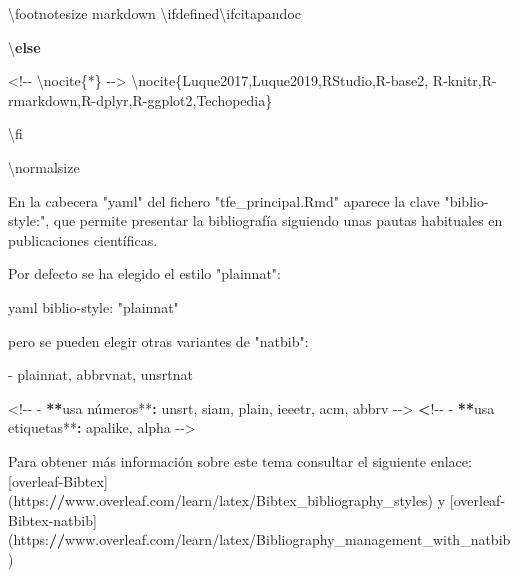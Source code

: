 \documentclass[11pt,a4paper,oneside,]{article}
\newenvironment{Shaded}{\begin{snugshade}}{\end{snugshade}}
\newcommand{\AttributeTok}[1]{\textcolor[rgb]{0.77,0.63,0.00}{#1}}
\newcommand{\ControlFlowTok}[1]{\textcolor[rgb]{0.13,0.29,0.53}{\textbf{#1}}}
\newcommand{\ErrorTok}[1]{\textcolor[rgb]{0.64,0.00,0.00}{\textbf{#1}}}
\newcommand{\NormalTok}[1]{#1}
\newcommand{\OtherTok}[1]{\textcolor[rgb]{0.56,0.35,0.01}{#1}}
\newcommand{\SpecialCharTok}[1]{\textcolor[rgb]{0.00,0.00,0.00}{#1}}
\newcommand{\StringTok}[1]{\textcolor[rgb]{0.31,0.60,0.02}{#1}}
\numberwithin{dummy}{section}
\theoremstyle{ocrenumbox}
\theoremstyle{blacknumex}
\theoremstyle{blacknumbox}
\theoremstyle{ocrenum}
\theoremstyle{ocrenum}
\begin{document}
\begin{Shaded}
\begin{Highlighting}[numbers=left,,firstnumber=1101,]
\NormalTok{\textbackslash{}footnotesize}
\StringTok{\textasciigrave{}\textasciigrave{}\textasciigrave{}\textasciigrave{}}\NormalTok{markdown}
\NormalTok{\textbackslash{}ifdefined\textbackslash{}ifcitapandoc}

\NormalTok{\textbackslash{}}\ControlFlowTok{else}

\SpecialCharTok{\textless{}!{-}{-}}\NormalTok{ \textbackslash{}nocite\{}\SpecialCharTok{*}\NormalTok{\} }\SpecialCharTok{{-}}\OtherTok{{-}\textgreater{}}
\NormalTok{\textbackslash{}nocite\{Luque2017,Luque2019,RStudio,R}\SpecialCharTok{{-}}\NormalTok{base2,}
\NormalTok{R}\SpecialCharTok{{-}}\NormalTok{knitr,R}\SpecialCharTok{{-}}\NormalTok{rmarkdown,R}\SpecialCharTok{{-}}\NormalTok{dplyr,R}\SpecialCharTok{{-}}\NormalTok{ggplot2,Techopedia\}}

\NormalTok{\textbackslash{}fi }

\StringTok{\textasciigrave{}\textasciigrave{}\textasciigrave{}\textasciigrave{}}
\NormalTok{\textbackslash{}normalsize}

 


\NormalTok{En la cabecera }\StringTok{"yaml"}\NormalTok{ del fichero }\StringTok{"tfe\_principal.Rmd"}\NormalTok{ aparece la clave }\StringTok{"biblio{-}style:"}\NormalTok{, que permite presentar la bibliografía siguiendo unas pautas habituales en publicaciones científicas. }

\NormalTok{Por defecto se ha elegido el estilo }\StringTok{"plainnat"}\SpecialCharTok{:}

\StringTok{\textasciigrave{}\textasciigrave{}\textasciigrave{}}\AttributeTok{yaml}
\AttributeTok{biblio{-}style: "plainnat" }
\StringTok{\textasciigrave{}\textasciigrave{}\textasciigrave{}}

\NormalTok{pero se pueden elegir otras variantes de }\StringTok{"natbib"}\SpecialCharTok{:}

\SpecialCharTok{{-}}\NormalTok{ plainnat, abbrvnat, unsrtnat}

\SpecialCharTok{\textless{}!{-}{-}} \SpecialCharTok{{-}} \ErrorTok{**}\NormalTok{usa números}\SpecialCharTok{**}\ErrorTok{:}\NormalTok{ unsrt, siam, plain, ieeetr, acm, abbrv }\SpecialCharTok{{-}}\OtherTok{{-}\textgreater{}}
\ErrorTok{\textless{}}\SpecialCharTok{!{-}{-}} \SpecialCharTok{{-}} \ErrorTok{**}\NormalTok{usa etiquetas}\SpecialCharTok{**}\ErrorTok{:}\NormalTok{ apalike, alpha }\SpecialCharTok{{-}}\OtherTok{{-}\textgreater{}}

\NormalTok{Para obtener más información sobre este tema consultar el siguiente enlace}\SpecialCharTok{:}\NormalTok{ [overleaf}\SpecialCharTok{{-}}\NormalTok{Bibtex](https}\SpecialCharTok{:}\ErrorTok{//}\NormalTok{www.overleaf.com}\SpecialCharTok{/}\NormalTok{learn}\SpecialCharTok{/}\NormalTok{latex}\SpecialCharTok{/}\NormalTok{Bibtex\_bibliography\_styles)}
\NormalTok{y }
\NormalTok{[overleaf}\SpecialCharTok{{-}}\NormalTok{Bibtex}\SpecialCharTok{{-}}\NormalTok{natbib](https}\SpecialCharTok{:}\ErrorTok{//}\NormalTok{www.overleaf.com}\SpecialCharTok{/}\NormalTok{learn}\SpecialCharTok{/}\NormalTok{latex}\SpecialCharTok{/}\NormalTok{Bibliography\_management\_with\_natbib)}


\end{Highlighting}
\end{Shaded}
\end{document}

